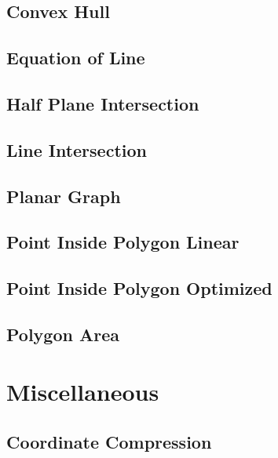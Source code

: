 \subsection{Convex Hull}
\raggedbottom
\hrulefill
\subsection{Equation of Line}
\raggedbottom
\hrulefill
\subsection{Half Plane Intersection}
\raggedbottom
\hrulefill
\subsection{Line Intersection}
\raggedbottom
\hrulefill
\subsection{Planar Graph}
\raggedbottom
\hrulefill
\subsection{Point Inside Polygon Linear}
\raggedbottom
\hrulefill
\subsection{Point Inside Polygon Optimized}
\raggedbottom
\hrulefill
\subsection{Polygon Area}
\raggedbottom
\hrulefill

\section{Miscellaneous}
\subsection{Coordinate Compression}
\raggedbottom
\hrulefill
